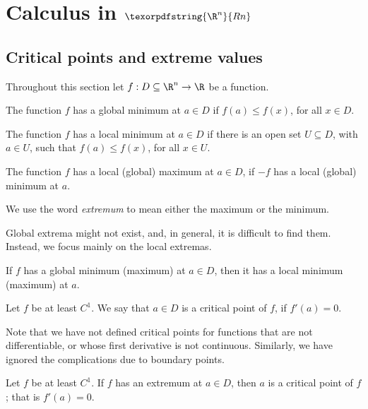 \section{Calculus in $\texorpdfstring{\R^n}{Rn}$}

\subsection{Critical points and extreme values}
Throughout this section let $f : D \subseteq \R^n \to \R$ be a function.

\begin{ndfn}
  The function $f$ has a global minimum at $a \in D$ if $f(a) \leq f(x)$, for all $x \in D$.
\end{ndfn}
\begin{ndfn}
  The function $f$ has a local minimum at $a \in D$ if there is an open set $U \subseteq D$, with $a \in U$, such that $f(a) \leq f(x)$, for all $x \in U$.
\end{ndfn}
\begin{ndfn}[Maximum]
  The function $f$ has a local (global) maximum at $a \in D$, if $-f$ has a local (global) minimum at $a$.
\end{ndfn}
We use the word \emph{extremum} to mean either the maximum or the minimum.

Global extrema might not exist, and, in general, it is difficult to find them. Instead, we focus mainly on the local extremas.
\begin{nprop}
  If $f$ has a global minimum (maximum) at $a \in D$, then it has a local minimum (maximum) at $a$.
\end{nprop}

\begin{ndfn}
  Let $f$ be at least $C^1$. We say that $a \in D$ is a critical point of $f$, if $f'(a) = 0$.
\end{ndfn}
Note that we have not defined critical points for functions that are not differentiable, or whose first derivative is not continuous. Similarly, we have ignored the complications due to boundary points.
\begin{nthm}
\label{thm:extremum-critical}
  Let $f$ be at least $C^1$. If $f$ has an extremum at $a \in D$, then $a$ is a critical point of $f$; that is $f'(a)=0$.
\end{nthm}

